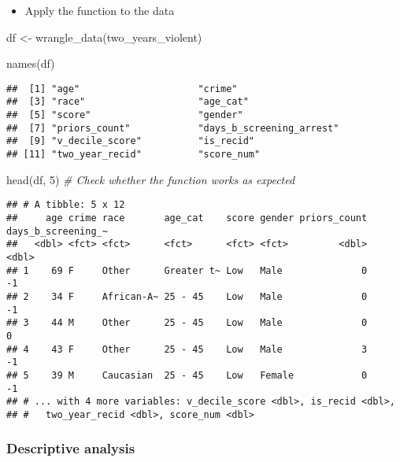 \documentclass[
]{book}
\newenvironment{Shaded}{\begin{snugshade}}{\end{snugshade}}
\newcommand{\CommentTok}[1]{\textcolor[rgb]{0.56,0.35,0.01}{\textit{#1}}}
\newcommand{\DecValTok}[1]{\textcolor[rgb]{0.00,0.00,0.81}{#1}}
\newcommand{\FunctionTok}[1]{\textcolor[rgb]{0.00,0.00,0.00}{#1}}
\newcommand{\NormalTok}[1]{#1}
\newcommand{\OtherTok}[1]{\textcolor[rgb]{0.56,0.35,0.01}{#1}}
\providecommand{\tightlist}{%
  \setlength{\itemsep}{0pt}\setlength{\parskip}{0pt}}
\begin{document}
\begin{itemize}
\tightlist
\item
  Apply the function to the data
\end{itemize}

\begin{Shaded}
\begin{Highlighting}[]
\NormalTok{df }\OtherTok{\textless{}{-}} \FunctionTok{wrangle\_data}\NormalTok{(two\_years\_violent)}

\FunctionTok{names}\NormalTok{(df)}
\end{Highlighting}
\end{Shaded}

\begin{verbatim}
##  [1] "age"                     "crime"                  
##  [3] "race"                    "age_cat"                
##  [5] "score"                   "gender"                 
##  [7] "priors_count"            "days_b_screening_arrest"
##  [9] "v_decile_score"          "is_recid"               
## [11] "two_year_recid"          "score_num"
\end{verbatim}

\begin{Shaded}
\begin{Highlighting}[]
\FunctionTok{head}\NormalTok{(df, }\DecValTok{5}\NormalTok{) }\CommentTok{\# Check whether the function works as expected }
\end{Highlighting}
\end{Shaded}

\begin{verbatim}
## # A tibble: 5 x 12
##     age crime race       age_cat    score gender priors_count days_b_screening_~
##   <dbl> <fct> <fct>      <fct>      <fct> <fct>         <dbl>              <dbl>
## 1    69 F     Other      Greater t~ Low   Male              0                 -1
## 2    34 F     African-A~ 25 - 45    Low   Male              0                 -1
## 3    44 M     Other      25 - 45    Low   Male              0                  0
## 4    43 F     Other      25 - 45    Low   Male              3                 -1
## 5    39 M     Caucasian  25 - 45    Low   Female            0                 -1
## # ... with 4 more variables: v_decile_score <dbl>, is_recid <dbl>,
## #   two_year_recid <dbl>, score_num <dbl>
\end{verbatim}

\hypertarget{descriptive-analysis-1}{%
\subsubsection{Descriptive analysis}\label{descriptive-analysis-1}}
\end{document}
